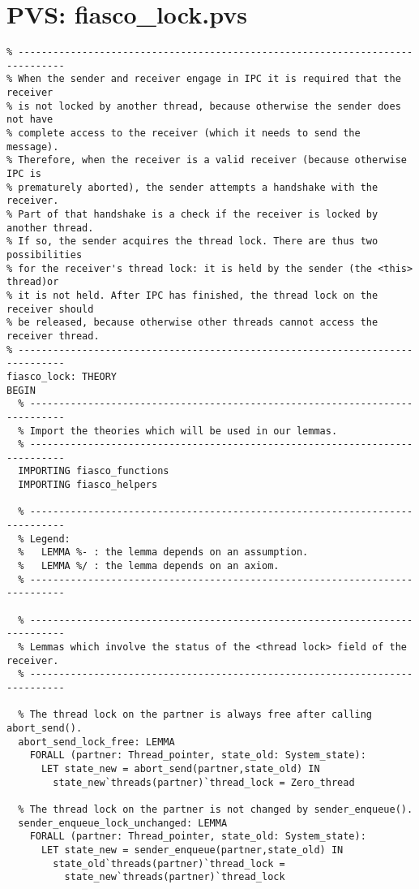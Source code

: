 \hypertarget{pvs_fiasco_lock}{\chapter{PVS: fiasco\_lock.pvs}}
\lstset{language=PVS}
\begin{lstlisting}
% ------------------------------------------------------------------------------
% When the sender and receiver engage in IPC it is required that the receiver
% is not locked by another thread, because otherwise the sender does not have
% complete access to the receiver (which it needs to send the message). 
% Therefore, when the receiver is a valid receiver (because otherwise IPC is 
% prematurely aborted), the sender attempts a handshake with the receiver. 
% Part of that handshake is a check if the receiver is locked by another thread.
% If so, the sender acquires the thread lock. There are thus two possibilities 
% for the receiver's thread lock: it is held by the sender (the <this> thread)or 
% it is not held. After IPC has finished, the thread lock on the receiver should 
% be released, because otherwise other threads cannot access the receiver thread.
% ------------------------------------------------------------------------------
fiasco_lock: THEORY
BEGIN
  % ----------------------------------------------------------------------------
  % Import the theories which will be used in our lemmas.
  % ----------------------------------------------------------------------------
  IMPORTING fiasco_functions
  IMPORTING fiasco_helpers 
  
  % ----------------------------------------------------------------------------
  % Legend:
  %   LEMMA %- : the lemma depends on an assumption.
  %   LEMMA %/ : the lemma depends on an axiom.
  % ----------------------------------------------------------------------------
  
  % ----------------------------------------------------------------------------
  % Lemmas which involve the status of the <thread lock> field of the receiver.
  % ----------------------------------------------------------------------------

  % The thread lock on the partner is always free after calling abort_send().
  abort_send_lock_free: LEMMA
    FORALL (partner: Thread_pointer, state_old: System_state):
      LET state_new = abort_send(partner,state_old) IN
        state_new`threads(partner)`thread_lock = Zero_thread

  % The thread lock on the partner is not changed by sender_enqueue().
  sender_enqueue_lock_unchanged: LEMMA
    FORALL (partner: Thread_pointer, state_old: System_state):
      LET state_new = sender_enqueue(partner,state_old) IN
        state_old`threads(partner)`thread_lock = 
          state_new`threads(partner)`thread_lock


\end{lstlisting}
